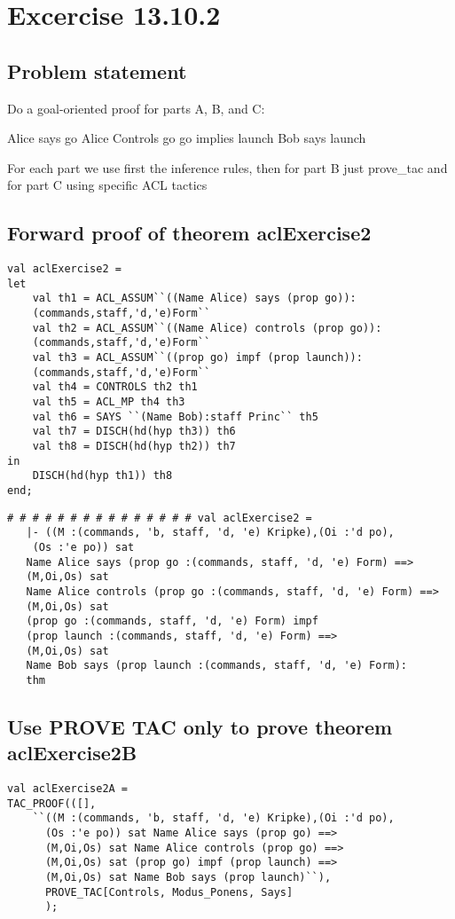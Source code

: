 \documentclass{report}
\begin{document}
\chapter{Excercise 13.10.2}
\label{cha:13-10-2}

\section{Problem statement}
\label{problem-statement-13-10-2}
Do a goal-oriented proof for parts A, B, and C: 

Alice says go   Alice Controls go  go implies launch 
Bob says launch 

For each part we use first the inference
rules, then for part B just prove_tac and for part C using specific
ACL tactics

\section{Forward proof of theorem aclExercise2}
\label{foward-13-10-2-A}
\begin{lstlisting}[frame=TBlr]
val aclExercise2 =
let
	val th1 = ACL_ASSUM``((Name Alice) says (prop go)):
	(commands,staff,'d,'e)Form``
 	val th2 = ACL_ASSUM``((Name Alice) controls (prop go)):
	(commands,staff,'d,'e)Form``
 	val th3 = ACL_ASSUM``((prop go) impf (prop launch)):
	(commands,staff,'d,'e)Form``
 	val th4 = CONTROLS th2 th1
 	val th5 = ACL_MP th4 th3
 	val th6 = SAYS ``(Name Bob):staff Princ`` th5
 	val th7 = DISCH(hd(hyp th3)) th6
 	val th8 = DISCH(hd(hyp th2)) th7
in
	DISCH(hd(hyp th1)) th8
end;
\end{lstlisting}

\begin{session}
  \begin{scriptsize}
\begin{verbatim}
# # # # # # # # # # # # # # # val aclExercise2 =
   |- ((M :(commands, 'b, staff, 'd, 'e) Kripke),(Oi :'d po),
    (Os :'e po)) sat
   Name Alice says (prop go :(commands, staff, 'd, 'e) Form) ==>
   (M,Oi,Os) sat
   Name Alice controls (prop go :(commands, staff, 'd, 'e) Form) ==>
   (M,Oi,Os) sat
   (prop go :(commands, staff, 'd, 'e) Form) impf
   (prop launch :(commands, staff, 'd, 'e) Form) ==>
   (M,Oi,Os) sat
   Name Bob says (prop launch :(commands, staff, 'd, 'e) Form):
   thm
\end{verbatim}
  \end{scriptsize}
\end{session}

\section{Use PROVE TAC only to prove theorem aclExercise2B}
\label{prove-13-10-2-B}
\begin{lstlisting}[frame=TBlr]
val aclExercise2A =
TAC_PROOF(([],
	``((M :(commands, 'b, staff, 'd, 'e) Kripke),(Oi :'d po),
	  (Os :'e po)) sat Name Alice says (prop go) ==>
  	  (M,Oi,Os) sat Name Alice controls (prop go) ==>
  	  (M,Oi,Os) sat (prop go) impf (prop launch) ==>
  	  (M,Oi,Os) sat Name Bob says (prop launch)``),
	  PROVE_TAC[Controls, Modus_Ponens, Says]
	  );
\end{lstlisting}
\end{document}
